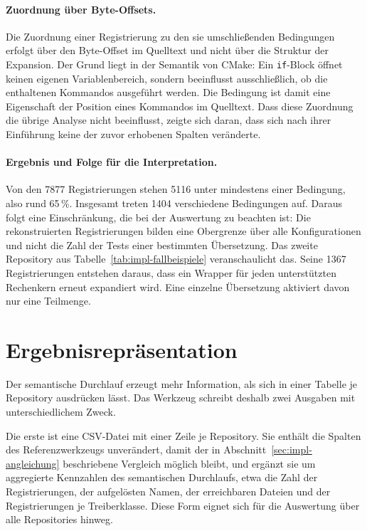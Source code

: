 \documentclass[12pt,a4paper,twoside,headsepline,parskip=half]{scrreprt}
\begin{document}
\paragraph{Zuordnung über Byte-Offsets.}
Die Zuordnung einer Registrierung zu den sie umschließenden Bedingungen erfolgt über
den Byte-Offset im Quelltext und nicht über die Struktur der Expansion. Der Grund
liegt in der Semantik von CMake: Ein \texttt{if}-Block öffnet keinen eigenen
Variablenbereich, sondern beeinflusst ausschließlich, ob die enthaltenen Kommandos
ausgeführt werden. Die Bedingung ist damit eine Eigenschaft der Position eines
Kommandos im Quelltext. Dass diese Zuordnung die übrige Analyse nicht beeinflusst,
zeigte sich daran, dass sich nach ihrer Einführung keine der zuvor erhobenen Spalten
veränderte.

\paragraph{Ergebnis und Folge für die Interpretation.}
Von den 7877 Registrierungen stehen 5116 unter mindestens einer Bedingung, also rund
65\,\%. Insgesamt treten 1404 verschiedene Bedingungen auf. Daraus folgt eine
Einschränkung, die bei der Auswertung zu beachten ist: Die rekonstruierten
Registrierungen bilden eine Obergrenze über alle Konfigurationen und nicht die Zahl
der Tests einer bestimmten Übersetzung. Das zweite Repository aus
Tabelle~\ref{tab:impl-fallbeispiele} veranschaulicht das. Seine 1367 Registrierungen
entstehen daraus, dass ein Wrapper für jeden unterstützten Rechenkern erneut expandiert
wird. Eine einzelne Übersetzung aktiviert davon nur eine Teilmenge.

\section{Ergebnisrepräsentation}
\label{sec:impl-ergebnis}

Der semantische Durchlauf erzeugt mehr Information, als sich in einer Tabelle je
Repository ausdrücken lässt. Das Werkzeug schreibt deshalb zwei Ausgaben mit
unterschiedlichem Zweck.

Die erste ist eine CSV-Datei mit einer Zeile je Repository. Sie enthält die Spalten des
Referenzwerkzeugs unverändert, damit der in Abschnitt~\ref{sec:impl-angleichung}
beschriebene Vergleich möglich bleibt, und ergänzt sie um aggregierte Kennzahlen des
semantischen Durchlaufs, etwa die Zahl der Registrierungen, der aufgelösten Namen, der
erreichbaren Dateien und der Registrierungen je Treiberklasse. Diese Form eignet sich
für die Auswertung über alle Repositories hinweg.
\end{document}
